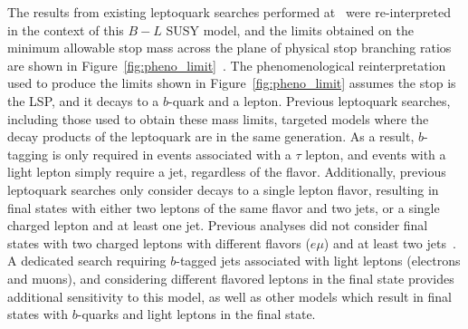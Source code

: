 The results from existing leptoquark searches performed at \atlas\ were
re-interpreted in the context of this $B-L$ SUSY model, and the
limits obtained on the minimum allowable stop mass across the plane of
physical stop branching ratios are shown in
Figure~\ref{fig:pheno_limit}~\cite{Marshall:2014cwa,Marshall:2014kea}.
The phenomenological reinterpretation used to produce the limits shown in
Figure~\ref{fig:pheno_limit} assumes the stop is the LSP, and it decays to a
$b$-quark and a lepton.
Previous leptoquark searches, including those used to obtain these mass limits,
targeted models where the decay products of the leptoquark are in the same
generation.
As a result, $b$-tagging is only required in events associated with a $\tau$
lepton, and events with a light lepton simply require a jet, regardless of the
flavor.
Additionally, previous leptoquark searches only consider decays to a single
lepton flavor, resulting in final states with either two leptons of the same
flavor and two jets, or a single charged lepton and at least one jet.
Previous analyses did not consider final states with two charged leptons
with different flavors ($e\mu$) and at least two 
jets~\cite{ATLAS:2013oea, ATLAS:2012aq, Aad:2011ch, CMS:2014qpa,
  Chatrchyan:2012sv, Chatrchyan:2012vza, Chatrchyan:2012st}.
A dedicated search requiring $b$-tagged jets associated with light leptons
(electrons and muons), and considering different flavored leptons in the final
state provides additional sensitivity to this model, as well as other models
which result in final states with $b$-quarks and light leptons in the final
state.

\begin{figure}[bh]
\end{figure}

